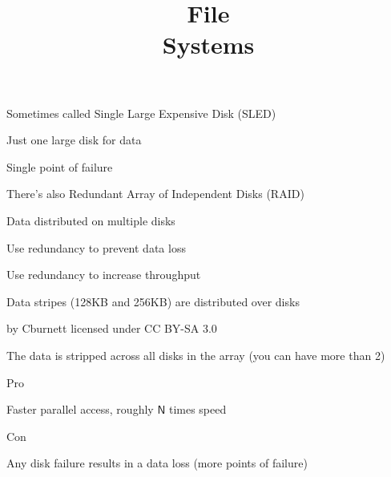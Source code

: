 
\usepackage{svg}

\title{File\\Systems}



\begin{frame}
    \titlepage
\end{frame}

\begin{slide}
  

  Sometimes called Single Large Expensive Disk (SLED)

  \leftspace{}Just one large disk for data

  \leftspace{}\leftspace{}Single point of failure
  \medskip

  There's also Redundant Array of Independent Disks (RAID)

  \leftspace{}Data distributed on multiple disks

  \leftspace{}\leftspace{}Use redundancy to prevent data loss

  \leftspace{}\leftspace{}Use redundancy to increase throughput

\end{slide}

\begin{slide}
  

  Data stripes (128KB and 256KB) are distributed over disks

  \begin{center}
    
  \end{center}
  
  \begin{flushright}
    by Cburnett licensed under CC BY-SA 3.0
  \end{flushright}

\end{slide}

\begin{slide}
  

  The data is stripped across all disks in the array (you can have more than 2)
  \medskip

  Pro

  \leftspace{}Faster parallel access, roughly $\mathsf{N}$ times speed
  \medskip

  Con

  \leftspace{}Any disk failure results in a data loss (more points of failure)

\end{slide}


